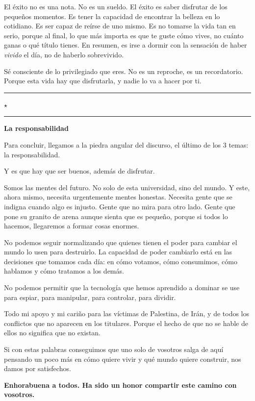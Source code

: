 \documentclass[20pt, a4paper]{extarticle}
\newcommand{\separador}{%
  \begin{center}
    \textcolor{dorado}{\rule{2cm}{0.4pt}\quad\(\star\)\quad\rule{2cm}{0.4pt}}
  \end{center}
  \vspace{0.3em}
}
\begin{document}
El éxito no es una nota. No es un sueldo.
El éxito es saber disfrutar de los pequeños momentos. Es tener la capacidad de encontrar la belleza en lo cotidiano. Es ser capaz de reírse de uno mismo. Es no tomarse la vida tan en serio, porque al final, lo que más importa es que te guste cómo vives, no cuánto ganas o qué título tienes.
En resumen, es irse a dormir con la sensación de haber \textit{vivido} el día, no de haberlo sobrevivido.

Sé consciente de lo privilegiado que eres.
No es un reproche, es un recordatorio.
Porque esta vida hay que disfrutarla, y nadie lo va a hacer por ti.

\separador

\textbf{\large\color{azulUR} La responsabilidad}

\medskip

Para concluir, llegamos a la piedra angular del discurso, el último de los 3 temas: la responsabilidad.

Y es que hay que ser buenos, además de disfrutar.

Somos las mentes del futuro. No solo de esta universidad, sino del mundo.
Y este, ahora mismo, necesita urgentemente mentes honestas.
Necesita gente que se indigna cuando algo es injusto.
Gente que no mira para otro lado.
Gente que pone su granito de arena aunque sienta que es pequeño, porque si todos lo hacemos, llegaremos a formar cosas enormes.

No podemos seguir normalizando que quienes tienen el poder para cambiar el mundo lo usen para destruirlo.
La capacidad de poder cambiarlo está en las decisiones que tomamos cada día: en cómo votamos, cómo consumimos, cómo hablamos y cómo tratamos a los demás.

No podemos permitir que la tecnología que hemos aprendido a dominar se use para espiar, para manipular, para controlar, para dividir. 

Todo mi apoyo y mi cariño para las víctimas de Palestina, de Irán, y de todos los conflictos que no aparecen en los titulares.
Porque el hecho de que no se hable de ellos no significa que no existan.



Si con estas palabras conseguimos que uno solo de vosotros salga de aquí pensando un poco más en cómo quiere vivir y qué mundo quiere construir, nos damos por satisfechos.

\vspace{1em}

{\large\bfseries Enhorabuena a todos. Ha sido un honor compartir este camino con vosotros.}
  \vspace{2.5cm}
\end{document}
